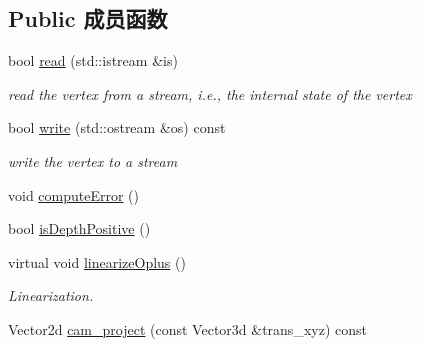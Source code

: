 \subsection*{Public 成员函数}
\begin{DoxyCompactItemize}
\item 
\hypertarget{classg2o_1_1EdgeSE3ProjectXYZ_a04200f3d6b7fbd47961df696f1ee34ed}{bool \hyperlink{classg2o_1_1EdgeSE3ProjectXYZ_a04200f3d6b7fbd47961df696f1ee34ed}{read} (std\-::istream \&is)}\label{classg2o_1_1EdgeSE3ProjectXYZ_a04200f3d6b7fbd47961df696f1ee34ed}

\begin{DoxyCompactList}\small\item\em read the vertex from a stream, i.\-e., the internal state of the vertex \end{DoxyCompactList}\item 
\hypertarget{classg2o_1_1EdgeSE3ProjectXYZ_a3f09d0456f011dfa53b6f61b566e27fd}{bool \hyperlink{classg2o_1_1EdgeSE3ProjectXYZ_a3f09d0456f011dfa53b6f61b566e27fd}{write} (std\-::ostream \&os) const }\label{classg2o_1_1EdgeSE3ProjectXYZ_a3f09d0456f011dfa53b6f61b566e27fd}

\begin{DoxyCompactList}\small\item\em write the vertex to a stream \end{DoxyCompactList}\item 
void \hyperlink{classg2o_1_1EdgeSE3ProjectXYZ_a79a763e1d42fe9eb5732abe59c7723d9}{compute\-Error} ()
\item 
bool \hyperlink{classg2o_1_1EdgeSE3ProjectXYZ_a603cc0018b5b05fd193e84e032a66d07}{is\-Depth\-Positive} ()
\item 
virtual void \hyperlink{classg2o_1_1EdgeSE3ProjectXYZ_a7454e89740635d782c9e4efaef35ec44}{linearize\-Oplus} ()
\begin{DoxyCompactList}\small\item\em Linearization. \end{DoxyCompactList}\item 
Vector2d \hyperlink{classg2o_1_1EdgeSE3ProjectXYZ_aa44a34f1d1a75d7263b7527d75f8a9dc}{cam\-\_\-project} (const Vector3d \&trans\-\_\-xyz) const 
\end{DoxyCompactItemize}
